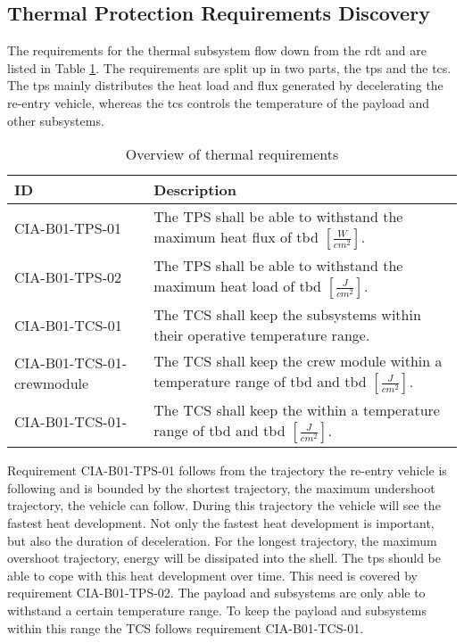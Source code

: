 \subsection{Thermal Protection Requirements Discovery} \label{sec:therm}
The requirements for the thermal subsystem flow down from the \gls{rdt} and are listed in Table \ref{tab:thermalreq}. The requirements are split up in two parts, the \gls{tps} and the \gls{tcs}. The \gls{tps} mainly distributes the heat load and flux generated by decelerating the re-entry vehicle, whereas the \gls{tcs} controls the temperature of the payload and other subsystems.


\begin{table}[H]
	\caption{Overview of thermal requirements}
	\begin{tabular}{|p{}|p{}|}
    \hline
    ID          & Description                                                                                                      \\ \hline \hline
    CIA-B01-TPS-01 & The TPS shall be able to withstand the maximum heat flux of \gls{tbd} $ \left[\frac{W}{cm^2}\right] $.               
\\ \hline
    CIA-B01-TPS-02 &  The TPS shall be able to withstand the maximum heat load of \gls{tbd} $ \left[\frac{J}{cm^2}\right] $.                
\\ \hline
    CIA-B01-TCS-01 & The TCS shall keep the subsystems within their operative temperature range.                                            
\\ \hline
    CIA-B01-TCS-01-crewmodule & The TCS shall keep the crew module within a temperature range of \gls{tbd} and \gls{tbd} $ \left[\frac{J}{cm^2}\right] $.                                        
\\ \hline
    CIA-B01-TCS-01- & The TCS shall keep the  within a temperature range of \gls{tbd} and \gls{tbd} $ \left[\frac{J}{cm^2}\right] $.                                        
\\ \hline

    \end{tabular}
    \label{tab:thermalreq}
\end{table}

Requirement CIA-B01-TPS-01 follows from the trajectory the re-entry vehicle is following and is bounded by the shortest trajectory, the maximum undershoot trajectory, the vehicle can follow. During this trajectory the vehicle will see the fastest heat development. Not only the fastest heat development is important, but also the duration of deceleration. For the longest trajectory, the maximum overshoot trajectory, energy will be dissipated into the shell. The \gls{tps} should be able to cope with this heat development over time. This need is covered by requirement CIA-B01-TPS-02. The payload and subsystems are only able to withstand a certain temperature range. To keep the payload and subsystems within this range the TCS follows requirement CIA-B01-TCS-01.


